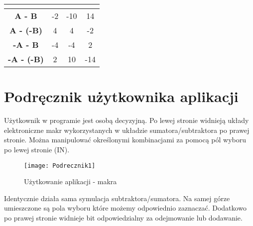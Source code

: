 \documentclass[12pt, a4paper, onside, polish]{article}				%
\begin{document}
\begin{table}[H]
\begin{tabular}{|c|ccc|}
\cellcolor[HTML]{EFEFEF}\textbf{}          & \multicolumn{1}{c|}{}                                              & \multicolumn{1}{c|}{}                                               &                                                \\ \hline
\rowcolor[HTML]{32CB00} 
\cellcolor[HTML]{EFEFEF}\textbf{A - B}     & \multicolumn{1}{c|}{\cellcolor[HTML]{32CB00}-2}                    & \multicolumn{1}{c|}{\cellcolor[HTML]{32CB00}-10}                    & 14                                             \\ \hline
\rowcolor[HTML]{32CB00} 
\cellcolor[HTML]{EFEFEF}\textbf{A - (-B)}  & \multicolumn{1}{c|}{\cellcolor[HTML]{32CB00}4}                     & \multicolumn{1}{c|}{\cellcolor[HTML]{32CB00}4}                      & -2                                             \\ \hline
\rowcolor[HTML]{32CB00} 
\cellcolor[HTML]{EFEFEF}\textbf{-A - B}    & \multicolumn{1}{c|}{\cellcolor[HTML]{32CB00}-4}                    & \multicolumn{1}{c|}{\cellcolor[HTML]{32CB00}-4}                     & 2                                              \\ \hline
\rowcolor[HTML]{32CB00} 
\cellcolor[HTML]{EFEFEF}\textbf{-A - (-B)} & \multicolumn{1}{c|}{\cellcolor[HTML]{32CB00}2}                     & \multicolumn{1}{c|}{\cellcolor[HTML]{32CB00}10}                     & -14                                            \\ \hline
\end{tabular}
\end{table}
\cleardoublepage



\section{Podręcznik użytkownika aplikacji}
\hspace{\parindent}
Użytkownik w programie jest osobą decyzyjną. Po lewej stronie widnieją układy elektroniczne makr wykorzystanych w układzie sumatora/subtraktora po prawej stronie. Można manipulować określonymi kombinacjami za pomocą pól wyboru po lewej stronie (IN).  

   	\begin{figure}[H]
  	  {\centering \texttt{[image: Podrecznik1]} \caption{Użytkowanie aplikacji - makra}}\vspace{5mm}
  	 \end{figure}
  	 
Identycznie działa sama symulacja subtraktora/sumatora. Na samej górze umieszczone są pola wyboru które możemy odpowiednio zaznaczać. Dodatkowo po prawej stronie widnieje bit odpowiedzialny za odejmowanie lub dodawanie. 
\end{document}
